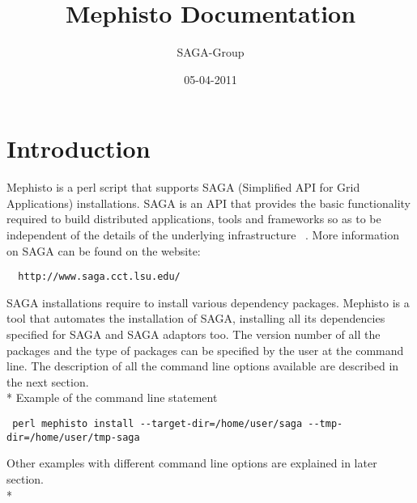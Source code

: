 \documentclass[a4paper,10pt]{article}
\newcommand{\jhanote}[1]{  {\textcolor{red}     { ***Shantenu: #1 }}}
\newcommand{\jhanote}[1]{}
\begin{document}
 \title{ \Large \vspace{-3.5em} Mephisto Documentation }
 
 \author{ SAGA-Group}
 \date{05-04-2011}
 \maketitle
 




\section*{Introduction}
Mephisto is a perl script that supports SAGA (Simplified API for Grid Applications) 
installations. SAGA is an API that provides the basic functionality required to build 
distributed applications, tools and frameworks so as to be independent of the details 
of the underlying infrastructure ~\cite{}. More information on SAGA can be found on 
the website:
\begin{verbatim}
  http://www.saga.cct.lsu.edu/
\end{verbatim}
SAGA installations require to install various dependency packages. 
Mephisto is a tool that automates the installation of SAGA, installing 
all its dependencies specified for SAGA and SAGA adaptors too.  
The version number of all the packages and the type of packages can 
be specified by the user at the command line. The description 
of all the command line options available are described 
in the next section.\\*
Example of the command line statement  
\begin{verbatim} perl mephisto install --target-dir=/home/user/saga --tmp-dir=/home/user/tmp-saga \end{verbatim}
Other examples with different command line options are explained in later section. \\*
\end{document}
